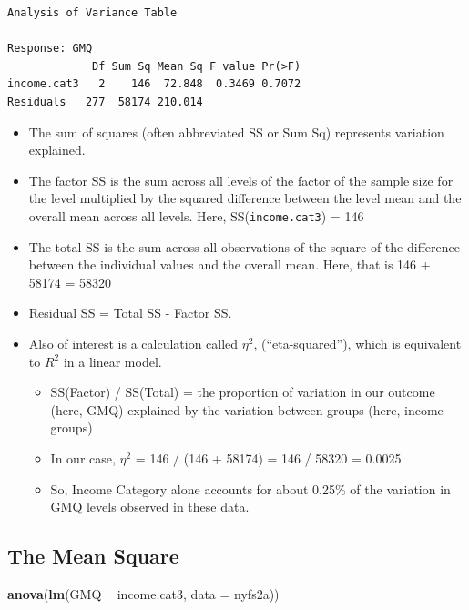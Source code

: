 \documentclass[
]{book}
\newenvironment{Shaded}{\begin{snugshade}}{\end{snugshade}}
\newcommand{\DataTypeTok}[1]{\textcolor[rgb]{0.13,0.29,0.53}{#1}}
\newcommand{\KeywordTok}[1]{\textcolor[rgb]{0.13,0.29,0.53}{\textbf{#1}}}
\newcommand{\NormalTok}[1]{#1}
\newcommand{\OperatorTok}[1]{\textcolor[rgb]{0.81,0.36,0.00}{\textbf{#1}}}
\newcommand{\StringTok}[1]{\textcolor[rgb]{0.31,0.60,0.02}{#1}}
\providecommand{\tightlist}{%
  \setlength{\itemsep}{0pt}\setlength{\parskip}{0pt}}
\begin{document}
\begin{verbatim}
Analysis of Variance Table

Response: GMQ
             Df Sum Sq Mean Sq F value Pr(>F)
income.cat3   2    146  72.848  0.3469 0.7072
Residuals   277  58174 210.014               
\end{verbatim}

\begin{itemize}
\tightlist
\item
  The sum of squares (often abbreviated SS or Sum Sq) represents variation explained.
\item
  The factor SS is the sum across all levels of the factor of the sample size for the level multiplied by the squared difference between the level mean and the overall mean across all levels. Here, SS(\texttt{income.cat3}) = 146
\item
  The total SS is the sum across all observations of the square of the difference between the individual values and the overall mean. Here, that is 146 + 58174 = 58320
\item
  Residual SS = Total SS - Factor SS.
\item
  Also of interest is a calculation called \(\eta^2\), (``eta-squared''), which is equivalent to \(R^2\) in a linear model.

  \begin{itemize}
  \tightlist
  \item
    SS(Factor) / SS(Total) = the proportion of variation in our outcome (here, GMQ) explained by the variation between groups (here, income groups)
  \item
    In our case, \(\eta^2\) = 146 / (146 + 58174) = 146 / 58320 = 0.0025
  \item
    So, Income Category alone accounts for about 0.25\% of the variation in GMQ levels observed in these data.
  \end{itemize}
\end{itemize}

\hypertarget{the-mean-square}{%
\subsection{The Mean Square}\label{the-mean-square}}

\begin{Shaded}
\begin{Highlighting}[]
\KeywordTok{anova}\NormalTok{(}\KeywordTok{lm}\NormalTok{(GMQ }\OperatorTok{~}\StringTok{ }\NormalTok{income.cat3, }\DataTypeTok{data =}\NormalTok{ nyfs2a))}
\end{Highlighting}
\end{Shaded}
\end{document}
